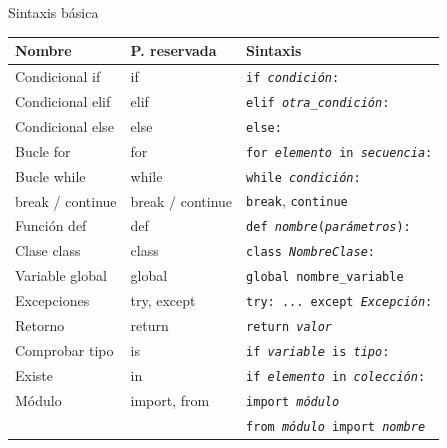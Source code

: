 \documentclass[11pt]{beamer}
\begin{document}
\begin{frame}{Sintaxis básica}
\small
\begin{longtable}{p{3cm}p{3cm}p{8cm}}
	\toprule
	\textbf{Nombre} & \textbf{P. reservada} & \textbf{Sintaxis} \\
	\midrule
	Condicional if & if & \texttt{if \textit{condición}:} \\
	Condicional elif & elif & \texttt{elif \textit{otra\_condición}:} \\
	Condicional else & else & \texttt{else:} \\
	Bucle for & for & \texttt{for \textit{elemento} in \textit{secuencia}:} \\
	Bucle while & while & \texttt{while \textit{condición}:} \\
	break / continue & break / continue & \texttt{break}, \texttt{continue}\\
	Función def & def & \texttt{def \textit{nombre}(\textit{parámetros}):} \\
	Clase class & class & \texttt{class \textit{NombreClase}:} \\
	Variable global & global & \texttt{global nombre\_variable} \\
	Excepciones & try, except & \texttt{try: ... except \textit{Excepción}:} \\
	Retorno & return & \texttt{return \textit{valor}} \\
	Comprobar tipo & is & \texttt{if \textit{variable} is \textit{tipo}:} \\
	Existe & in & \texttt{if \textit{elemento} in \textit{colección}:} \\
	Módulo & import, from & \texttt{import \textit{módulo}} \\
		   &  & \texttt{from \textit{módulo} import \textit{nombre}} \\
	\bottomrule
\end{longtable}
\end{frame}	
	
\end{document}
